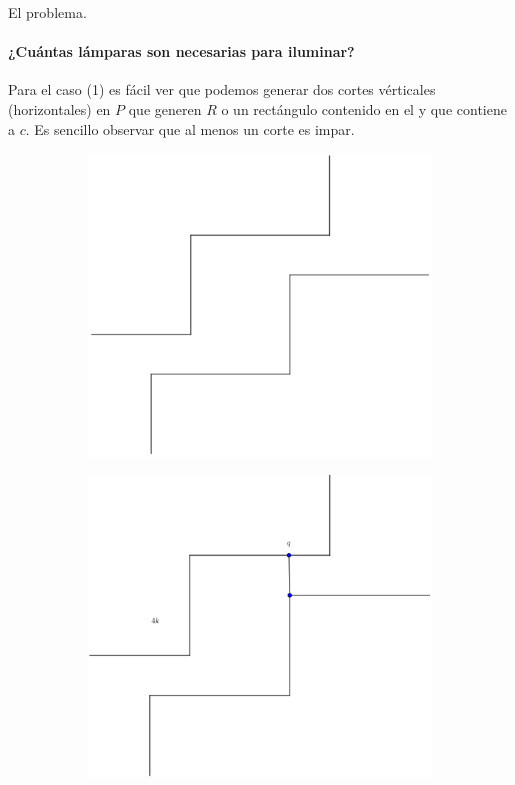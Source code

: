 \begin{frame}{El problema.} %
  \framesubtitle{¿Cuántas lámparas son necesarias para iluminar?} %
  Para el caso (1) es fácil ver que podemos generar dos cortes vérticales (horizontales) en $P$ que generen $R$
  o un rectángulo contenido en el y que contiene a $c$. Es sencillo observar que al menos un corte es impar.
  \begin{figure}
    \centering
    \begin{subfigure}[b]{0.25\paperwidth}
      \includegraphics[width=.3 \paperwidth]{./images/Ejemplar.png}
    \end{subfigure}
    \begin{subfigure}[b]{0.25\paperwidth}
      \includegraphics[width=.3 \paperwidth]{./images/EjemplarC1(4k).png}

\end{subfigure}
\end{figure}
\end{frame}
